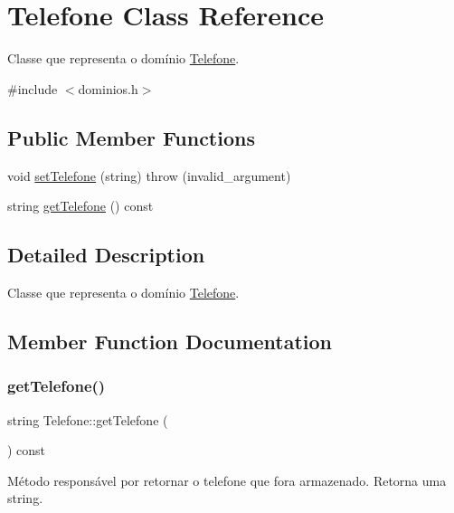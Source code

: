 \hypertarget{classTelefone}{}\section{Telefone Class Reference}
\label{classTelefone}


Classe que representa o domínio \hyperlink{classTelefone}{Telefone}.  




{\ttfamily \#include $<$dominios.\+h$>$}

\subsection*{Public Member Functions}
\begin{DoxyCompactItemize}
\item 
void \hyperlink{classTelefone_a79516b37434ff927bd2a9bd66080a36d}{set\+Telefone} (string)  throw (invalid\+\_\+argument)
\item 
string \hyperlink{classTelefone_a64d1e99657fde65bb698ddcd56e7eb04}{get\+Telefone} () const
\end{DoxyCompactItemize}


\subsection{Detailed Description}
Classe que representa o domínio \hyperlink{classTelefone}{Telefone}. 

\subsection{Member Function Documentation}
\mbox{\label{classTelefone_a64d1e99657fde65bb698ddcd56e7eb04}} 
\subsubsection{\texorpdfstring{get\+Telefone()}{getTelefone()}}
{\footnotesize\ttfamily string Telefone\+::get\+Telefone (\begin{DoxyParamCaption}{ }\end{DoxyParamCaption}) const\hspace{0.3cm}{\ttfamily [inline]}}

Método responsável por retornar o telefone que fora armazenado. Retorna uma string. \mbox{\label{classTelefone_a79516b37434ff927bd2a9bd66080a36d}} 
